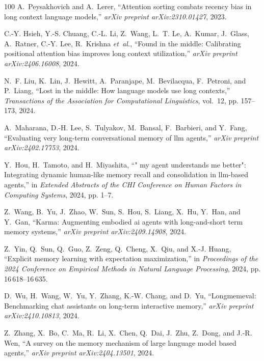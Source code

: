 \documentclass[10pt,journal,compsoc]{IEEEtran}
\begin{document}
\begin{thebibliography}{100}
	A.~Peysakhovich and A.~Lerer, ``Attention sorting combats recency bias in long
	context language models,'' \emph{arXiv preprint arXiv:2310.01427}, 2023.
	
	C.-Y. Hsieh, Y.-S. Chuang, C.-L. Li, Z.~Wang, L.~T. Le, A.~Kumar, J.~Glass,
	A.~Ratner, C.-Y. Lee, R.~Krishna \emph{et~al.}, ``Found in the middle:
	Calibrating positional attention bias improves long context utilization,''
	\emph{arXiv preprint arXiv:2406.16008}, 2024.
	
	N.~F. Liu, K.~Lin, J.~Hewitt, A.~Paranjape, M.~Bevilacqua, F.~Petroni, and
	P.~Liang, ``Lost in the middle: How language models use long contexts,''
	\emph{Transactions of the Association for Computational Linguistics},
	vol.~12, pp. 157--173, 2024.
	
	A.~Maharana, D.-H. Lee, S.~Tulyakov, M.~Bansal, F.~Barbieri, and Y.~Fang,
	``Evaluating very long-term conversational memory of llm agents,''
	\emph{arXiv preprint arXiv:2402.17753}, 2024.
	
	Y.~Hou, H.~Tamoto, and H.~Miyashita, ``" my agent understands me better":
	Integrating dynamic human-like memory recall and consolidation in llm-based
	agents,'' in \emph{Extended Abstracts of the CHI Conference on Human Factors
		in Computing Systems}, 2024, pp. 1--7.
	
	Z.~Wang, B.~Yu, J.~Zhao, W.~Sun, S.~Hou, S.~Liang, X.~Hu, Y.~Han, and Y.~Gan,
	``Karma: Augmenting embodied ai agents with long-and-short term memory
	systems,'' \emph{arXiv preprint arXiv:2409.14908}, 2024.
	
	Z.~Yin, Q.~Sun, Q.~Guo, Z.~Zeng, Q.~Cheng, X.~Qiu, and X.-J. Huang, ``Explicit
	memory learning with expectation maximization,'' in \emph{Proceedings of the
		2024 Conference on Empirical Methods in Natural Language Processing}, 2024,
	pp. 16\,618--16\,635.
	
	D.~Wu, H.~Wang, W.~Yu, Y.~Zhang, K.-W. Chang, and D.~Yu, ``Longmemeval:
	Benchmarking chat assistants on long-term interactive memory,'' \emph{arXiv
		preprint arXiv:2410.10813}, 2024.
	
	Z.~Zhang, X.~Bo, C.~Ma, R.~Li, X.~Chen, Q.~Dai, J.~Zhu, Z.~Dong, and J.-R. Wen,
	``A survey on the memory mechanism of large language model based agents,''
	\emph{arXiv preprint arXiv:2404.13501}, 2024.
	

\end{thebibliography}
\end{document}

